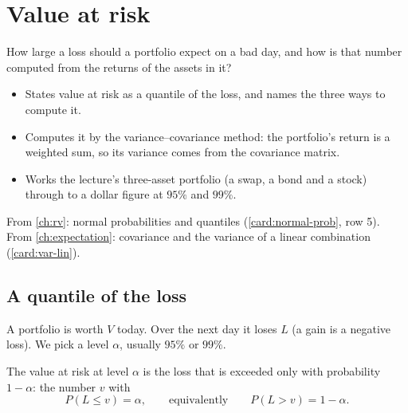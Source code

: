 \chapter{Value at risk}
\label{ch:var}

\begin{question}
How large a loss should a portfolio expect on a bad day, and how is that number computed from the returns of the assets in it?
\end{question}

\begin{whatfor}
\begin{itemize}
  \item States value at risk as a quantile of the loss, and names the three ways to compute it.
  \item Computes it by the variance--covariance method: the portfolio's return is a weighted sum, so its variance comes from the covariance matrix.
  \item Works the lecture's three-asset portfolio (a swap, a bond and a stock) through to a dollar figure at $95\%$ and $99\%$.
\end{itemize}
\end{whatfor}

\begin{prereq}
From \cref{ch:rv}: normal probabilities and quantiles (\cref{card:normal-prob}, row 5). From \cref{ch:expectation}: covariance and the variance of a linear combination (\cref{card:var-lin}).
\end{prereq}

\section{A quantile of the loss}

\begin{setup}
A portfolio is worth $V$ today. Over the next day it loses $L$ (a gain is a negative loss). We pick a level $\alpha$, usually $95\%$ or $99\%$.
\end{setup}

\begin{definition}
\label{def:var}
The value at risk at level $\alpha$ is the loss that is exceeded only with probability $1-\alpha$: the number $v$ with
\[
  P(L\le v)=\alpha,\qquad\text{equivalently}\qquad P(L>v)=1-\alpha.
\]
\end{definition}


